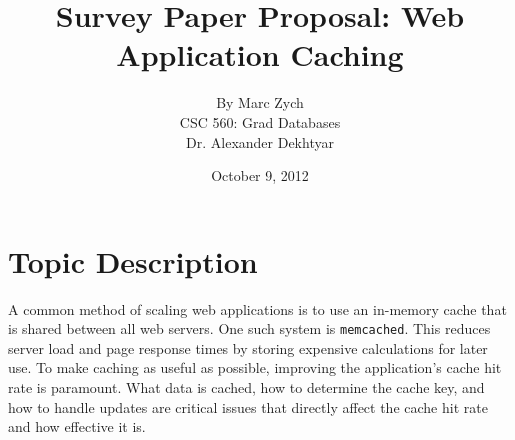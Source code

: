 \documentclass[12pt]{article}
\begin{document}
\title{\vfill Survey Paper Proposal: Web Application Caching}

\author{
By Marc Zych \vspace{10pt} \\
CSC 560: Grad Databases \vspace{10pt} \\
Dr. Alexander Dekhtyar \vspace{10pt} \\
}
\date{October 9, 2012}

\maketitle


\thispagestyle{empty}
\newpage



\section{Topic Description}
A common method of scaling web applications is to use an in-memory cache that is shared between all web servers.
One such system is \texttt{memcached}.
This reduces server load and page response times by storing expensive calculations for later use.
To make caching as useful as possible, improving the application's cache hit rate is paramount.
What data is cached, how to determine the cache key, and how to handle updates are critical issues that directly affect the cache hit rate and how effective it is.


\newpage
\nocite{*}


\end{document}
